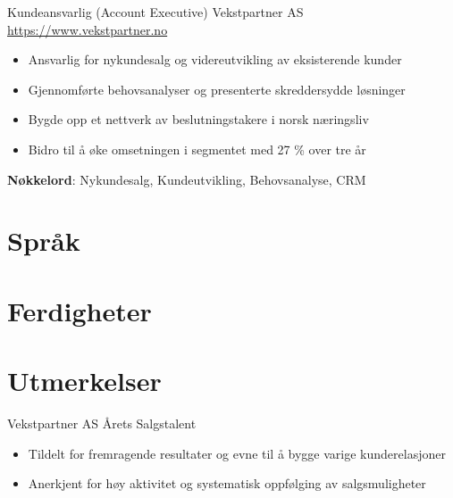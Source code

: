 \documentclass[a4paper, serif, 10pt]{moderncv}
\begin{document}
        {Kundeansvarlig (Account Executive)}
        {Vekstpartner AS}
        {\url{https://www.vekstpartner.no}}
        {}
        {\begin{itemize}
\item Ansvarlig for nykundesalg og videreutvikling av eksisterende kunder
\item Gjennomførte behovsanalyser og presenterte skreddersydde løsninger
\item Bygde opp et nettverk av beslutningstakere i norsk næringsliv
\item Bidro til å øke omsetningen i segmentet med 27 \% over tre år
\end{itemize}
\textbf{Nøkkelord}: Nykundesalg, Kundeutvikling, Behovsanalyse, CRM}
\section{Språk}

\section{Ferdigheter}

\section{Utmerkelser}

        {Vekstpartner AS}
        {Årets Salgstalent}
        {}
        {}
        {\begin{itemize}
\item Tildelt for fremragende resultater og evne til å bygge varige kunderelasjoner
\item Anerkjent for høy aktivitet og systematisk oppfølging av salgsmuligheter
\end{itemize}}
\end{document}
